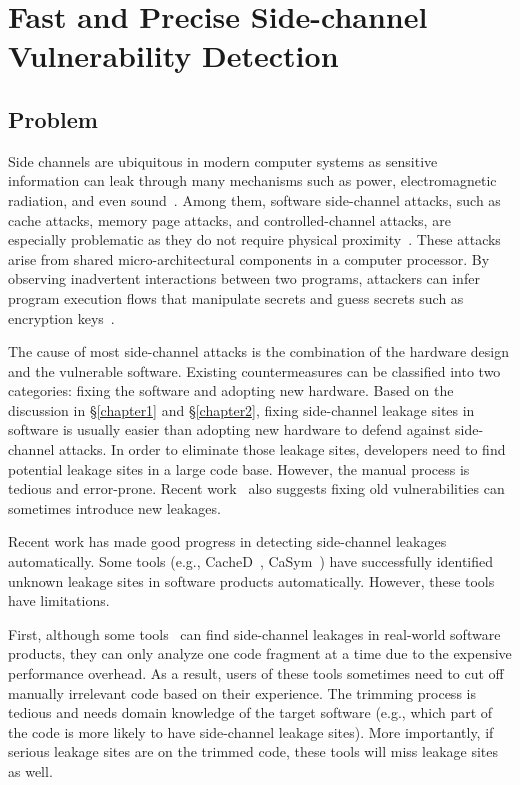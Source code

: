 
\chapter{Fast and Precise Side-channel Vulnerability Detection}\label{chapter3}
\section{Problem}
Side channels are ubiquitous in modern computer systems as sensitive information can leak through many mechanisms such as power, electromagnetic radiation, and even sound~\cite{agrawal2002side,kar20178,chari1999towards,217605,genkin2014rsa}.  Among them, software side-channel attacks, such as cache attacks, memory page attacks, and controlled-channel attacks, are especially problematic as they do not require physical proximity~\cite{7163052,217543,217589,lee2017inferring,191010,liu2015last}. These attacks arise from shared micro-architectural components in a computer processor. By observing inadvertent interactions between two programs, attackers can infer program execution flows that manipulate secrets and guess secrets such as encryption keys~\cite{Osvik2006,Gullasch:2011:CGB:2006077.2006784,203878,10.1007/978-3-540-45238-6_6}.

The cause of most side-channel attacks is the combination of the hardware design and the vulnerable software. Existing countermeasures can be classified into two categories: fixing the software and adopting new hardware. Based on the discussion in \S\ref{chapter1} and \S\ref{chapter2}, fixing side-channel leakage sites in software is usually easier than adopting new hardware to defend against side-channel attacks. In order to eliminate those leakage sites, developers need to find potential leakage sites in a large code base. However, the manual process is tedious and error-prone. Recent work~\cite{203878} also suggests fixing old vulnerabilities can sometimes introduce new leakages.

Recent work has made good progress in detecting side-channel leakages automatically. Some tools (e.g., CacheD~\cite{203878}, CaSym~\cite{Brotzman19Casym}) have successfully identified unknown leakage sites in software products automatically. However, these tools have limitations.

First, although some tools~\cite{Brotzman19Casym} can find side-channel leakages in real-world software products, they can only analyze one code fragment at a time due to the expensive performance overhead. As a result, users of these tools sometimes need to cut off manually irrelevant code based on their experience. The trimming process is tedious and needs domain knowledge of the target software (e.g., which part of the code is more likely to have side-channel leakage sites). More importantly, if serious leakage sites are on the trimmed code, these tools will miss leakage sites as well.

